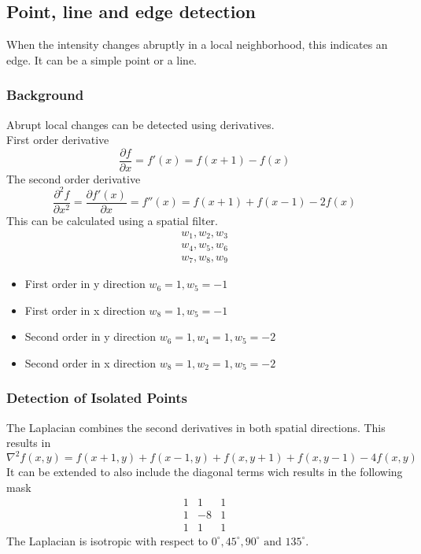 \subsection{Point, line and edge detection}

When the intensity changes abruptly in a local neighborhood, this indicates an edge. It can be a simple point or a line.

\subsubsection{Background}

Abrupt local changes can be detected using derivatives.\\
First order derivative
\[
	\frac{\partial f}{\partial x} = f'(x)=f(x+1)-f(x)
\]
The second order derivative
\[
	\frac{\partial^2f}{\partial x^2}=\frac{\partial f'(x)}{\partial x}=f''(x)=f(x+1)+f(x-1)-2f(x)
\]
This can be calculated using a spatial filter.
\[
	\begin{matrix}
	w_1, w_2, w_3\\
	w_4, w_5, w_6\\
	w_7, w_8, w_9
	\end{matrix}
\]
\begin{itemize}
\item First order in y direction $w_6=1, w_5=-1$
\item First order in x direction $w_8=1, w_5=-1$
\item Second order in y direction $w_6=1, w_4=1, w_5=-2$
\item Second order in x direction $w_8=1, w_2=1, w_5=-2$
\end{itemize}
\subsubsection{Detection of Isolated Points}
The Laplacian combines the second derivatives in both spatial directions. This results in
\[
	\nabla^2f(x,y)=f(x+1,y)+f(x-1,y)+f(x,y+1)+f(x,y-1)-4f(x,y)
\]
It can be extended to also include the diagonal terms wich results in the following mask
\[
	\begin{matrix}
	 1 & 1 & 1\\
	 1 & -8 & 1\\
	 1 & 1 & 1
	\end{matrix}
\]
The Laplacian is isotropic with respect to $0^\circ, 45^\circ, 90^\circ \text{ and } 135^\circ$. 

